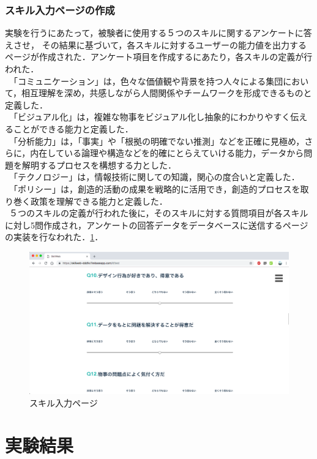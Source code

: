 \documentclass{funthesis}
\begin{document}
\subsubsection{スキル入力ページの作成}
実験を行うにあたって，被験者に使用する５つのスキルに関するアンケートに答えさせ，
その結果に基づいて，各スキルに対するユーザーの能力値を出力するページが作成された．アンケート項目を作成するにあたり，各スキルの定義が行われた．\\
\ 「コミュニケーション」は，色々な価値観や背景を持つ人々による集団において，相互理解を深め，共感しながら人間関係やチームワークを形成できるものと定義した．\\
\ 「ビジュアル化」は，複雑な物事をビジュアル化し抽象的にわかりやすく伝えることができる能力と定義した．\\
\ 「分析能力」は，「事実」や「根拠の明確でない推測」などを正確に見極め，さらに，内在している論理や構造などを的確にとらえていける能力，データから問題を解明するプロセスを構想する力とした．\\
\ 「テクノロジー」は，情報技術に関しての知識，関心の度合いと定義した．\\
\ 「ポリシー」は，創造的活動の成果を戦略的に活用でき，創造的プロセスを取り巻く政策を理解できる能力と定義した．\\
\ ５つのスキルの定義が行われた後に，そのスキルに対する質問項目が各スキルに対し5問作成され，アンケートの回答データをデータベースに送信するページの実装を行なわれた．\ref{testtest}．

\begin{figure}[h]
 \centering
   \includegraphics[width=150mm]{figures/test.png}
 \caption{スキル入力ページ}
 \label{testtest}
\end{figure}




\section{実験結果}
\end{document}
